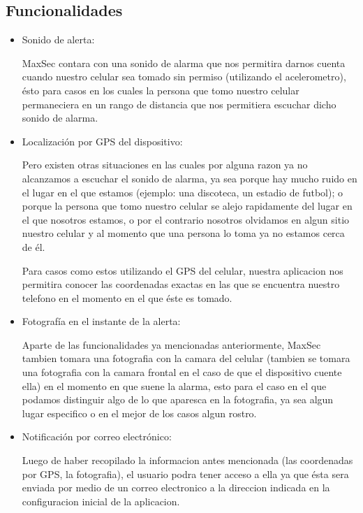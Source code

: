 \documentclass[12pt,letterpaper]{article}
\begin{document}
   \subsection{Funcionalidades} 
   \begin{itemize}
   \item Sonido de alerta: 
   
   MaxSec contara con una sonido de alarma que nos permitira darnos cuenta cuando nuestro celular sea tomado sin permiso (utilizando el acelerometro), ésto para casos en los cuales la persona que tomo nuestro celular permaneciera en un rango de distancia que nos permitiera escuchar dicho sonido de alarma.
   
   \item Localización por GPS del dispositivo:
   
   Pero existen otras situaciones en las cuales por alguna razon ya no alcanzamos a escuchar el sonido de alarma, ya sea porque hay mucho ruido en el lugar en el que estamos (ejemplo: una discoteca, un estadio de futbol); o porque la persona que tomo nuestro celular se alejo rapidamente del lugar en el que nosotros estamos, o por el contrario nosotros olvidamos en algun sitio nuestro celular y al momento que una persona lo toma ya no estamos cerca de él.
   
   Para casos como estos utilizando el GPS del celular, nuestra aplicacion nos permitira conocer las coordenadas exactas en las que se encuentra nuestro telefono en el momento en el que éste es tomado.
   
   \item Fotografía en el instante de la alerta:
   
   Aparte de las funcionalidades ya mencionadas anteriormente, MaxSec tambien tomara una fotografia con la camara del celular (tambien se tomara una fotografia con la camara frontal en el caso de que el dispositivo cuente ella) en el momento en que suene la alarma, esto para el caso en el que podamos distinguir algo de lo que aparesca en la fotografia, ya sea algun lugar especifico o en el mejor de los casos algun rostro.
   
   \item Notificación por correo electrónico:
   
   Luego de haber recopilado la informacion antes mencionada (las coordenadas por GPS, la fotografia), el usuario podra tener acceso a ella ya que ésta sera enviada por medio de un correo electronico a la direccion indicada en la configuracion inicial de la aplicacion.
   
    
   \end{itemize}
   
\end{document}
